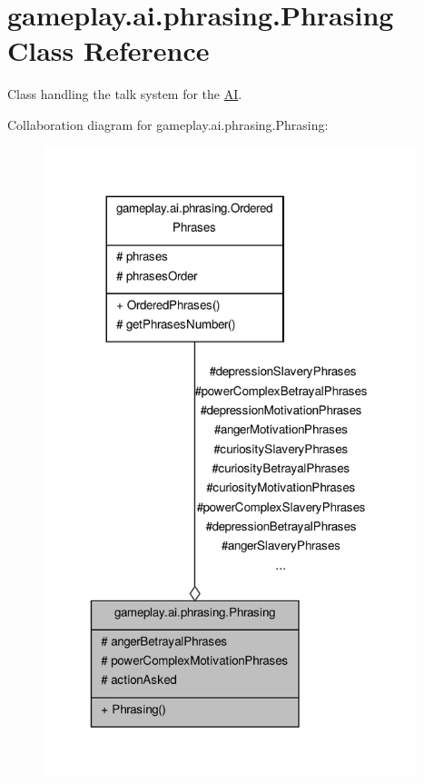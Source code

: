 \hypertarget{classgameplay_1_1ai_1_1phrasing_1_1_phrasing}{\section{gameplay.\-ai.\-phrasing.\-Phrasing Class Reference}
\label{classgameplay_1_1ai_1_1phrasing_1_1_phrasing}
}


Class handling the talk system for the \hyperlink{classgameplay_1_1ai_1_1_a_i}{A\-I}.  




Collaboration diagram for gameplay.\-ai.\-phrasing.\-Phrasing\-:\nopagebreak
\begin{figure}[H]
\begin{center}
\leavevmode
\includegraphics[width=308pt]{classgameplay_1_1ai_1_1phrasing_1_1_phrasing__coll__graph}
\end{center}
\end{figure}
